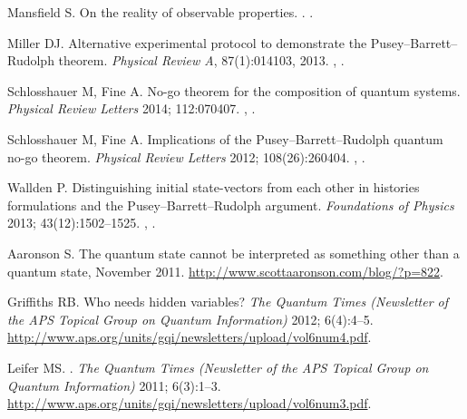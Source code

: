 \documentclass[DIV=calc,fontsize=12pt]{scrartcl} %
\theoremstyle{definition}
\theoremstyle{plain}
\begin{document}
\begin{thebibliography}{999}
Mansfield S.
\newblock On the reality of observable properties.
.
\newblock \href {http://arxiv.org/abs/1306.3216} {}.

Miller DJ.
\newblock Alternative experimental protocol to demonstrate the
Pusey--Barrett--Rudolph theorem.
\newblock \emph{Physical Review A}, 87(1):014103, 2013.
\newblock \href {http://arxiv.org/abs/1202.6465} {},
\href {http://dx.doi.org/10.1103/PhysRevA.87.014103}
{}.

Schlosshauer M, Fine A.
\newblock No-go theorem for the composition of quantum systems.
\newblock \emph{Physical Review Letters} 2014; 112:070407.
\newblock \href {http://arxiv.org/abs/1306.5805} {},
\href {http://dx.doi.org/10.1103/PhysRevLett.112.070407}
{}.

Schlosshauer M, Fine A.
\newblock Implications of the Pusey--Barrett--Rudolph quantum no-go theorem.
\newblock \emph{Physical Review Letters} 2012; 108(26):260404.
\newblock \href {http://arxiv.org/abs/1203.4779} {},
\href {http://dx.doi.org/10.1103/PhysRevLett.108.260404}
{}.

Wallden P.
\newblock Distinguishing initial state-vectors from each other in histories
formulations and the Pusey--Barrett--Rudolph argument.
\newblock \emph{Foundations of Physics} 2013; 43(12):1502--1525.
\newblock \href {http://arxiv.org/abs/1211.2084} {},
\href {http://dx.doi.org/10.1007/s10701-013-9759-8}
{}.

Aaronson S.
\newblock The quantum state cannot be interpreted as something other than a
quantum state, November 2011.
\newblock \url{http://www.scottaaronson.com/blog/?p=822}.

Griffiths RB.
\newblock Who needs hidden variables?
\newblock \emph{The Quantum Times (Newsletter of the APS Topical Group on
Quantum Information)} 2012; 6(4):4--5.
\newblock \url{http://www.aps.org/units/gqi/newsletters/upload/vol6num4.pdf}.

Leifer MS.
.
\newblock \emph{The Quantum Times (Newsletter of the APS Topical Group on
Quantum Information)} 2011; 6(3):1--3.
\newblock \url{http://www.aps.org/units/gqi/newsletters/upload/vol6num3.pdf}.


\end{thebibliography}
\end{document}
